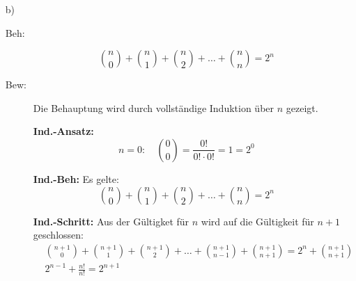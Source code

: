 \documentclass[12pt,a4paper,leqno]{article}
\begin{document}
\begin{enumerate}
\begin{enumerate}
\begin{description}
\end{description}

			
\item[b)] 

\begin{description}
\item[Beh:] $${n \choose 0} + {n \choose 1} + {n \choose 2} + \dots + {n \choose n} = 2^n$$
\item[Bew:] Die Behauptung wird durch vollständige Induktion über $n$ gezeigt.

\textbf{Ind.-Ansatz: }
$$n = 0 : \quad {0 \choose 0} = \frac{0!}{0! \cdot 0!} = 1 = 2^0$$

\textbf{Ind.-Beh:}
Es gelte:
$${n \choose 0} + {n \choose 1} + {n \choose 2} + \dots + {n \choose n} = 2^n $$

\textbf{Ind.-Schritt: }
Aus der Gültigket für $n$ wird auf die Gültigkeit für $n+1$ geschlossen:
\begin{align*}
&{n + 1 \choose 0} + {n + 1 \choose 1} + {n + 1 \choose 2} + \dots + {n+1 \choose n-1} + {n + 1 \choose n + 1} = 2^n + {n + 1 \choose n + 1} \\[12pt]
 & 2^{n-1} + \frac {n!}{n!} = 2^{n+1} 
\end{align*}

\end{description}

\end{enumerate}


\end{enumerate}
\end{document}
